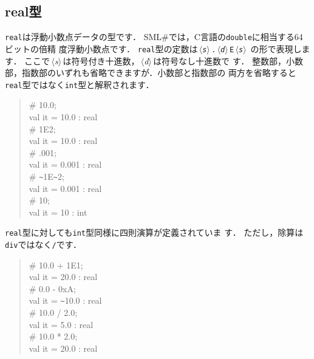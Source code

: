 \documentclass{jbook}
\newcommand{\smlsharp}{SML\#}
\newcommand{\code}[1]{\mbox{\large\tt #1}}
\newcommand{\nonterm}[1]{\mbox{$\,\langle$}{\it #1}\mbox{$\rangle\,$}}
\newenvironment{program}{\begin{quote}\begin{tt}}%
                        {\end{tt}\end{quote}}
\begin{document}
\subsection{real型}
	{\tt real}は浮動小数点データの型です．
	\smlsharp{}では，C言語の\code{double}に相当する64ビットの倍精
度浮動小数点です．
	{\tt real}型の定数は{\tt \nonterm{s}.\nonterm{d}E\nonterm{s}}
の形で表現します．
	ここで\nonterm{s}は符号付き十進数，\nonterm{d}は符号なし十進数で
す．
	整数部，小数部，指数部のいずれも省略できますが．小数部と指数部の
両方を省略すると{\tt real}型ではなく{\tt int}型と解釈されます．
\begin{program}
\# 10.0;\\
val it = 10.0 : real\\
\# 1E2;\\
val it = 10.0 : real\\
\# .001;\\
val it = 0.001 : real\\
\# \verb|~|1E\verb|~|2;\\
val it = 0.001 : real\\
\# 10;\\
val it = 10 : int
\end{program}
	{\tt real}型に対しても{\tt int}型同様に四則演算が定義されていま
す．
	ただし，除算は{\tt div}ではなく{\tt /}です．
\begin{program}
\# 10.0 + 1E1;\\
val it = 20.0 : real\\
\# 0.0 - 0xA;\\
val it = \verb|~|10.0 : real\\
\# 10.0 / 2.0;\\
val it = 5.0 : real\\
\# 10.0 * 2.0;\\
val it = 20.0 : real
\end{program}
\end{document}
